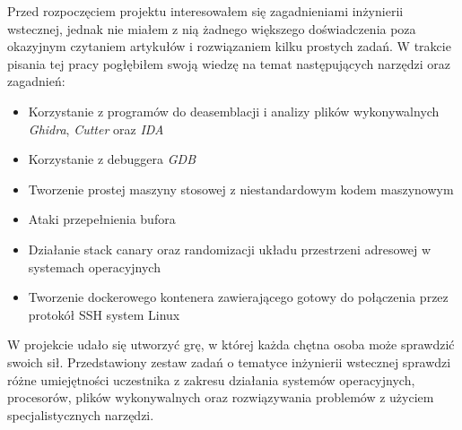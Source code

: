 \documentclass[language=polish,type=eng]{aghmodern}
\begin{document}
Przed rozpoczęciem projektu interesowałem się zagadnieniami inżynierii wstecznej, jednak
nie miałem z nią żadnego większego doświadczenia poza okazyjnym czytaniem artykułów
i rozwiązaniem kilku prostych zadań. W trakcie pisania tej pracy pogłębiłem
swoją wiedzę na temat następujących narzędzi oraz zagadnień:

\begin{itemize}
    \item Korzystanie z programów do deasemblacji i analizy plików wykonywalnych
        \emph{Ghidra}, \emph{Cutter} oraz \emph{IDA}
    \item Korzystanie z debuggera \emph{GDB}
    \item Tworzenie prostej maszyny stosowej z niestandardowym kodem maszynowym
    \item Ataki przepełnienia bufora
    \item Działanie stack canary oraz randomizacji układu przestrzeni adresowej
        w systemach operacyjnych
    \item Tworzenie dockerowego kontenera zawierającego gotowy do połączenia przez
        protokół SSH system Linux
\end{itemize}

W projekcie udało się utworzyć grę, w której każda chętna osoba może sprawdzić
swoich sił. Przedstawiony zestaw zadań o tematyce inżynierii wstecznej
sprawdzi różne umiejętności uczestnika z zakresu działania systemów operacyjnych,
procesorów, plików wykonywalnych oraz rozwiązywania problemów z użyciem specjalistycznych
narzędzi.
\end{document}
